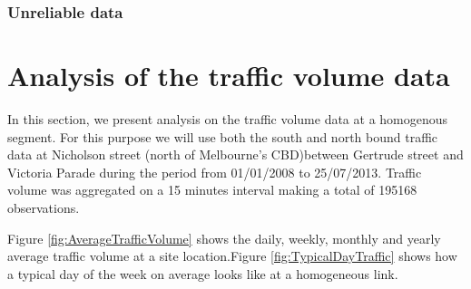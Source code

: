 \subsubsection{Unreliable data}

\section{Analysis of the traffic volume data}


In this section, we present analysis on the traffic volume data at a homogenous segment.
For this purpose we will use both the south and north bound traffic data at Nicholson
street (north of Melbourne's CBD)between Gertrude street and Victoria Parade during the period
from 01/01/2008 to 25/07/2013. Traffic volume was aggregated on a 15 minutes interval making a total
of 195168 observations.


Figure \ref{fig:AverageTrafficVolume} shows the daily, weekly, monthly and yearly average traffic
volume at a site location.Figure \ref{fig:TypicalDayTraffic} shows how a typical day of the week
on average looks like at a homogeneous link.

